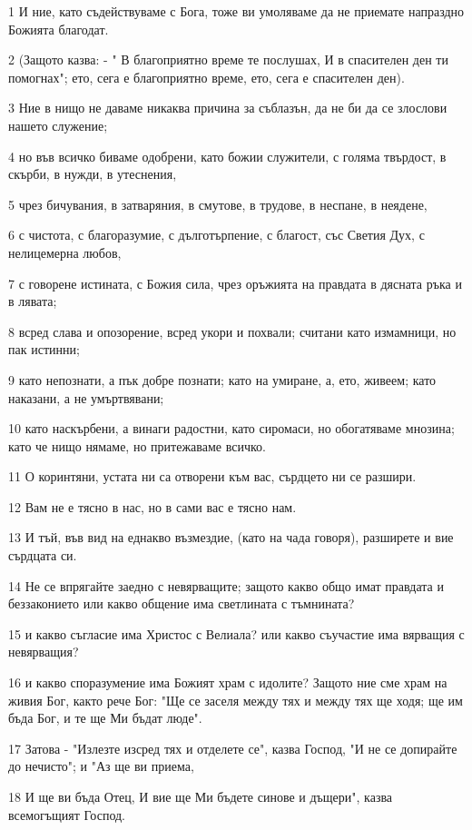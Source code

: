 \par 1 И ние, като съдействуваме с Бога, тоже ви умоляваме да не приемате напраздно Божията благодат.
\par 2 (Защото казва: - " В благоприятно време те послушах, И в спасителен ден ти помогнах"; ето, сега е благоприятно време, ето, сега е спасителен ден).
\par 3 Ние в нищо не даваме никаква причина за съблазън, да не би да се злослови нашето служение;
\par 4 но във всичко биваме одобрени, като божии служители, с голяма твърдост, в скърби, в нужди, в утеснения,
\par 5 чрез бичувания, в затваряния, в смутове, в трудове, в неспане, в неядене,
\par 6 с чистота, с благоразумие, с дълготърпение, с благост, със Светия Дух, с нелицемерна любов,
\par 7 с говорене истината, с Божия сила, чрез оръжията на правдата в дясната ръка и в лявата;
\par 8 всред слава и опозорение, всред укори и похвали; считани като измамници, но пак истинни;
\par 9 като непознати, а пък добре познати; като на умиране, а, ето, живеем; като наказани, а не умъртвявани;
\par 10 като наскърбени, а винаги радостни, като сиромаси, но обогатяваме мнозина; като че нищо нямаме, но притежаваме всичко.
\par 11 О коринтяни, устата ни са отворени към вас, сърдцето ни се разшири.
\par 12 Вам не е тясно в нас, но в сами вас е тясно нам.
\par 13 И тъй, във вид на еднакво възмездие, (като на чада говоря), разширете и вие сърдцата си.
\par 14 Не се впрягайте заедно с невярващите; защото какво общо имат правдата и беззаконието или какво общение има светлината с тъмнината?
\par 15 и какво съгласие има Христос с Велиала? или какво съучастие има вярващия с невярващия?
\par 16 и какво споразумение има Божият храм с идолите? Защото ние сме храм на живия Бог, както рече Бог: "Ще се заселя между тях и между тях ще ходя; ще им бъда Бог, и те ще Ми бъдат люде".
\par 17 Затова - "Излезте изсред тях и отделете се", казва Господ, "И не се допирайте до нечисто"; и "Аз ще ви приема,
\par 18 И ще ви бъда Отец, И вие ще Ми бъдете синове и дъщери", казва всемогъщият Господ.


